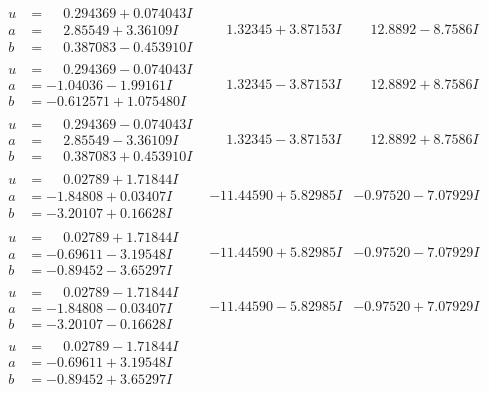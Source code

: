 \documentclass[1p]{elsarticle_modified}
\theoremstyle{definition}
\begin{document}
$$\begin{array}{c|c|c}
\begin{aligned}
u &= \phantom{-}0.294369 + 0.074043 I \\
a &= \phantom{-}2.85549 + 3.36109 I \\
b &= \phantom{-}0.387083 - 0.453910 I\end{aligned}
 & \phantom{-}1.32345 + 3.87153 I & \phantom{-}12.8892 - 8.7586 I \\ \hline\begin{aligned}
u &= \phantom{-}0.294369 - 0.074043 I \\
a &= -1.04036 - 1.99161 I \\
b &= -0.612571 + 1.075480 I\end{aligned}
 & \phantom{-}1.32345 - 3.87153 I & \phantom{-}12.8892 + 8.7586 I \\ \hline\begin{aligned}
u &= \phantom{-}0.294369 - 0.074043 I \\
a &= \phantom{-}2.85549 - 3.36109 I \\
b &= \phantom{-}0.387083 + 0.453910 I\end{aligned}
 & \phantom{-}1.32345 - 3.87153 I & \phantom{-}12.8892 + 8.7586 I \\ \hline\begin{aligned}
u &= \phantom{-}0.02789 + 1.71844 I \\
a &= -1.84808 + 0.03407 I \\
b &= -3.20107 + 0.16628 I\end{aligned}
 & -11.44590 + 5.82985 I & -0.97520 - 7.07929 I \\ \hline\begin{aligned}
u &= \phantom{-}0.02789 + 1.71844 I \\
a &= -0.69611 - 3.19548 I \\
b &= -0.89452 - 3.65297 I\end{aligned}
 & -11.44590 + 5.82985 I & -0.97520 - 7.07929 I \\ \hline\begin{aligned}
u &= \phantom{-}0.02789 - 1.71844 I \\
a &= -1.84808 - 0.03407 I \\
b &= -3.20107 - 0.16628 I\end{aligned}
 & -11.44590 - 5.82985 I & -0.97520 + 7.07929 I \\ \hline\begin{aligned}
u &= \phantom{-}0.02789 - 1.71844 I \\
a &= -0.69611 + 3.19548 I \\
b &= -0.89452 + 3.65297 I\end{aligned}

\end{array}$$
\end{document}
